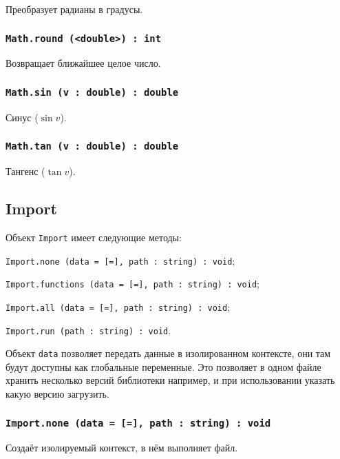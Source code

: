 Преобразует радианы в градусы.

\subsubsection{\texttt{Math.round (<double>) : int}}

Возвращает ближайшее целое число.

\subsubsection{\texttt{Math.sin (v : double) : double}}

Синус ($\sin{v}$).

\subsubsection{\texttt{Math.tan (v : double) : double}}

Тангенс ($\tan{v}$).

\subsection{{\color{orange} Import}}

Объект \texttt{Import} имеет следующие методы:
\begin{icItems}
	\item \texttt{Import.none (data = [=], path : string) : void};
	\item \texttt{Import.functions (data = [=], path : string) : void};
	\item \texttt{Import.all (data = [=], path : string) : void};
	\item \texttt{Import.run (path : string) : void}.
\end{icItems}

Объект \texttt{data} позволяет передать данные в изолированном контексте, они там будут доступны как глобальные переменные. Это позволяет в одном файле хранить несколько версий библиотеки например, и при использовании указать какую версию загрузить.

\subsubsection{\texttt{Import.none (data = [=], path : string) : void}}

Создаёт изолируемый контекст, в нём выполняет файл.

